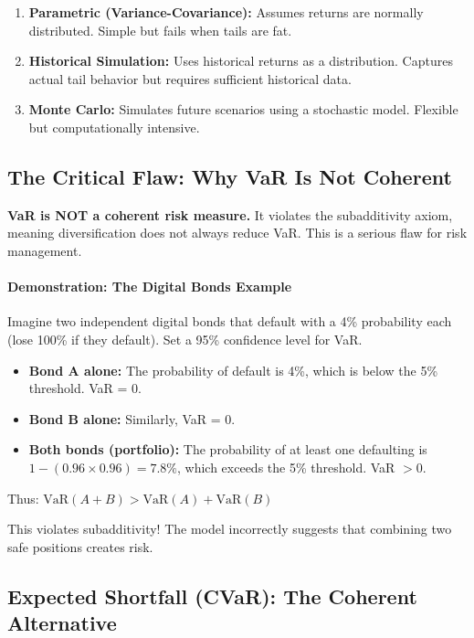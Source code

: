 \begin{enumerate}
    \item \textbf{Parametric (Variance-Covariance):} Assumes returns are normally distributed. Simple but fails when tails are fat.
    \item \textbf{Historical Simulation:} Uses historical returns as a distribution. Captures actual tail behavior but requires sufficient historical data.
    \item \textbf{Monte Carlo:} Simulates future scenarios using a stochastic model. Flexible but computationally intensive.
\end{enumerate}

\subsection{The Critical Flaw: Why VaR Is Not Coherent}

\textbf{VaR is NOT a coherent risk measure.} It violates the subadditivity axiom, meaning diversification does not always reduce VaR. This is a serious flaw for risk management.

\paragraph{Demonstration: The Digital Bonds Example}

Imagine two independent digital bonds that default with a 4\% probability each (lose 100\% if they default). Set a 95\% confidence level for VaR.

\begin{itemize}
    \item \textbf{Bond A alone:} The probability of default is 4\%, which is below the 5\% threshold. VaR = 0.
    \item \textbf{Bond B alone:} Similarly, VaR = 0.
    \item \textbf{Both bonds (portfolio):} The probability of at least one defaulting is $1 - (0.96 \times 0.96) = 7.8\%$, which exceeds the 5\% threshold. VaR $> 0$.
\end{itemize}

Thus: $\text{VaR}(A + B) > \text{VaR}(A) + \text{VaR}(B)$

This violates subadditivity! The model incorrectly suggests that combining two safe positions creates risk.

\subsection{Expected Shortfall (CVaR): The Coherent Alternative}

